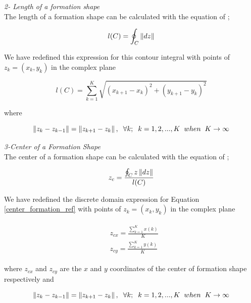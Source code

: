 \textit{ 	2- Length of a formation shape} \\ 
The length of a formation shape can be calculated with the equation of \cite{17};
		
\begin{equation}
l(C)= \oint_C \left\lVert dz\right\rVert
\end{equation}
		
We have redefined this expression for this contour integral with points of   $z_k = (x_k,y_k)$ in the complex plane

\begin{equation}
l(C) = \sum_{k=1}^{K}\sqrt{(x_{k+1} - x_k)^2 + (y_{k+1} - y_k)^2}
\end{equation}

where

\begin{equation}
\left\lVert z_k - z_{k-1}\right\rVert = \left\lVert z_{k+1} - z_k\right\rVert, \hspace{0.2cm}  \forall k ;  \hspace{0.2cm} k=1,2,...,K \hspace{0.2cm} when  \hspace{0.2cm} K \to\infty
\end{equation}
		
\textit{ 	3-Center of a Formation Shape} \\ 	
The center of a formation shape can be calculated with the equation of \cite{17};

\begin{equation} \label{center_formation_ref}
 z_c = \frac{\oint_C z\left\lVert dz\right\rVert}{l(C)}
\end{equation}
		
We have redefined the discrete domain expression for Equation \ref{center_formation_ref} with points of  $z_k = (x_k,y_k)$ in the complex plane

\begin{align}
\begin{split}
&z_{cx} = \frac{\sum_{k=1}^{K}x(k)}{K}  \\
&z_{cy} = \frac{\sum_{k=1}^{K}y(k)}{K}  
\end{split}
\end{align}
		
where $z_{cx}$ and $z_{cy}$ are the $x$ and $y$ coordinates of the center of formation shape respectively and

\begin{equation}
\left\lVert z_k - z_{k-1}\right\rVert = \left\lVert z_{k+1} - z_k\right\rVert, \hspace{0.2cm}  \forall k ;  \hspace{0.2cm} k=1,2,...,K \hspace{0.2cm} when  \hspace{0.2cm} K \to\infty
\end{equation}


